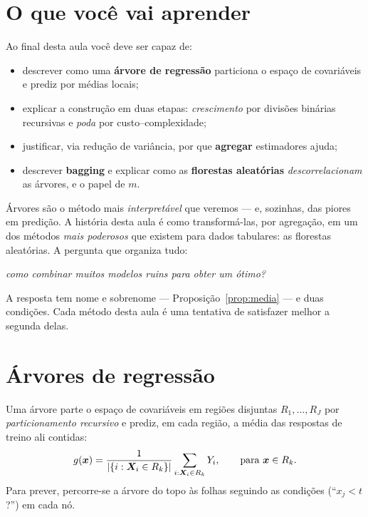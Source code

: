 \documentclass[11pt,a4paper]{article}
\title{}
\date{}
\begin{document}

\section*{O que você vai aprender}
Ao final desta aula você deve ser capaz de:
\begin{itemize}[leftmargin=1.4cm]
  \item descrever como uma \textbf{árvore de regressão} particiona o espaço de
        covariáveis e prediz por médias locais;
  \item explicar a construção em duas etapas: \emph{crescimento} por divisões
        binárias recursivas e \emph{poda} por custo--complexidade;
  \item justificar, via redução de variância, por que \textbf{agregar} estimadores
        ajuda;
  \item descrever \textbf{bagging} e explicar como as \textbf{florestas
        aleatórias} \emph{descorrelacionam} as árvores, e o papel de $m$.
\end{itemize}

\noindent
Árvores são o método mais \emph{interpretável} que veremos --- e, sozinhas, das
piores em predição. A história desta aula é como transformá-las, por agregação, em
um dos métodos \emph{mais poderosos} que existem para dados tabulares: as
florestas aleatórias. A pergunta que organiza tudo:

\begin{center}\itshape
  como combinar muitos modelos ruins para obter um ótimo?
\end{center}

\noindent
A resposta tem nome e sobrenome --- Proposição~\ref{prop:media} --- e duas condições.
Cada método desta aula é uma tentativa de satisfazer melhor a segunda delas.

\section{Árvores de regressão}
Uma árvore parte o espaço de covariáveis em regiões disjuntas $R_1,\dots,R_J$ por
\emph{particionamento recursivo} e prediz, em cada região, a média das respostas de
treino ali contidas:
\begin{equation}\label{eq:arvore}
  g(\bm{x}) = \frac{1}{\left\lvert \{i:\bm{X}_i\in R_k\} \right\rvert}\sum_{i:\bm{X}_i\in R_k} Y_i,
  \qquad \text{para } \bm{x}\in R_k .
\end{equation}
Para prever, percorre-se a árvore do topo às folhas seguindo as condições
(``$x_j<t$?'') em cada nó.
\end{document}
